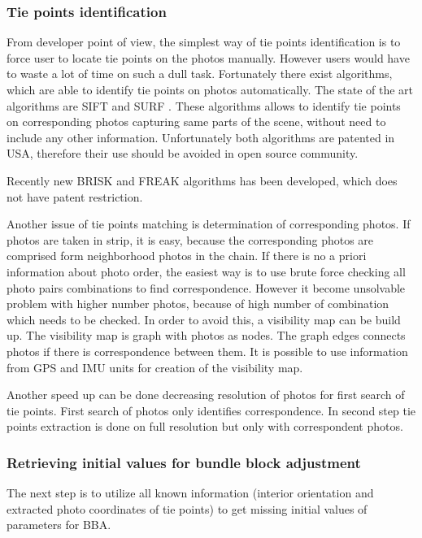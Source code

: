 \documentclass[a4paper,12pt]{article}
\begin{document}
\subsubsection{Tie points identification}

From developer point of view, the simplest way of tie points identification is to force user to locate tie points on 
the photos manually. However users would have to waste a lot of time on such a 
dull task. Fortunately there  exist algorithms, which are able to identify tie points on photos
automatically. The state of the art algorithms are SIFT \cite{wiki:SIFT} and SURF \cite{wiki:SURF}.
These algorithms allows to identify tie points on corresponding photos capturing same parts of the scene, without need to include any other information.
Unfortunately both algorithms are patented in USA, therefore their use should be avoided in open source community.

Recently new BRISK \cite{leutenegger2011brisk} and FREAK \cite{alahi2012freak} algorithms
has been developed, which does not have patent restriction. 

Another issue of tie points matching is determination of corresponding photos. 
If photos are taken in strip, it is easy, because the corresponding photos are comprised form neighborhood photos 
in the chain.
If there is no a priori information about photo order, the easiest way is to use brute force 
checking all photo pairs combinations to find correspondence.
However it become unsolvable problem with higher number photos, because 
of high number of combination which needs to be checked. In order to avoid this, a visibility map \cite{barazzetti2010extraction} can be build up. 
The visibility map is graph with photos as nodes. The graph edges connects photos if there is
correspondence between them.  It is possible to use information from GPS and IMU units for creation of the visibility map.

Another speed up can be done decreasing resolution of photos 
for first search of tie points. First search of photos only identifies correspondence.
In second step tie points extraction is done on full resolution but only with correspondent photos.

\subsubsection{Retrieving initial values for bundle block adjustment}

The next step is to utilize all known information (interior orientation and extracted 
photo coordinates of tie points) to get missing initial values of parameters for BBA. 
\end{document}

